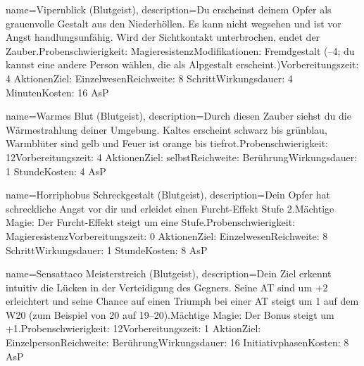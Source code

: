 {
    name={Vipernblick (Blutgeist)},
    description={Du erscheinst deinem Opfer als grauenvolle Gestalt aus den Niederhöllen. Es kann nicht wegsehen und ist vor Angst handlungsunfähig. Wird der Sichtkontakt unterbrochen, endet der Zauber.\newline Probenschwierigkeit: Magieresistenz\newline Modifikationen: Fremdgestalt (–4; du kannst eine andere Person wählen, die als Alpgestalt erscheint.)\newline Vorbereitungszeit: 4 Aktionen\newline Ziel: Einzelwesen\newline Reichweite: 8 Schritt\newline Wirkungsdauer: 4 Minuten\newline Kosten: 16 AsP}
}


{
    name={Warmes Blut (Blutgeist)},
    description={Durch diesen Zauber siehst du die Wärmestrahlung deiner Umgebung. Kaltes erscheint schwarz bis grünblau, Warmblüter sind gelb und Feuer ist orange bis tiefrot.\newline Probenschwierigkeit: 12\newline Vorbereitungszeit: 4 Aktionen\newline Ziel: selbst\newline Reichweite: Berührung\newline Wirkungsdauer: 1 Stunde\newline Kosten: 4 AsP}
}


{
    name={Horriphobus Schreckgestalt (Blutgeist)},
    description={Dein Opfer hat schreckliche Angst vor dir und erleidet einen Furcht-Effekt Stufe 2.\newline Mächtige Magie: Der Furcht-Effekt steigt um eine Stufe.\newline Probenschwierigkeit: Magieresistenz\newline Vorbereitungszeit: 0 Aktionen\newline Ziel: Einzelwesen\newline Reichweite: 8 Schritt\newline Wirkungsdauer: 1 Stunde\newline Kosten: 8 AsP}
}


{
    name={Sensattaco Meisterstreich (Blutgeist)},
    description={Dein Ziel erkennt intuitiv die Lücken in der Verteidigung des Gegners. Seine AT sind um +2 erleichtert und seine Chance auf einen Triumph bei einer AT steigt um 1 auf dem W20 (zum Beispiel von 20 auf 19–20).\newline Mächtige Magie: Der Bonus steigt um +1.\newline Probenschwierigkeit: 12\newline Vorbereitungszeit: 1 Aktion\newline Ziel: Einzelperson\newline Reichweite: Berührung\newline Wirkungsdauer: 16 Initiativphasen\newline Kosten: 8 AsP}
}



